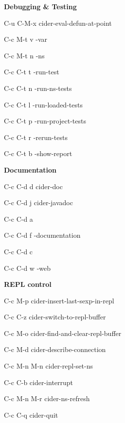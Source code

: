 \documentclass[a4paper,10pt]{article}
\renewcommand\section[1]{\bigskip\par\textbf{\large#1}\medskip}
\newcommand\keyify[1]{\keys{\ttfamily#1}}
\begin{document}
\begin{multicols}{2}
\columnbreak

\section{Debugging \& Testing}
\begin{keylist}[labelwidth=\widthof{\keyify{C-c C-d C-a}}]
\item[C-u C-M-x] cider-eval-defun-at-point
\item[C-c M-t v] -var
\item[C-c M-t n] \ns                    -ns
\item[C-c C-t t] -run-test
\item[C-c C-t n] \ns            -run-ns-tests
\item[C-c C-t l] \ns            -run-loaded-tests
\item[C-c C-t p] \ns            -run-project-tests
\item[C-c C-t r] \ns            -rerun-tests
\item[C-c C-t b] \ns            -show-report
\end{keylist}

\section{Documentation}
\begin{keylist}[labelwidth=\widthof{\keyify{C-c C-d C-a}}]
  \item[C-c C-d d] cider-doc
  \item[C-c C-d j] cider-javadoc
  \item[C-c C-d a] 
  \item[C-c C-d f] \ns               -documentation
  \item[C-c C-d c] 
  \item[C-c C-d w] \ns                   -web
\end{keylist}

\section{REPL control}
\begin{keylist}[labelwidth=\widthof{\keyify{C-c M-c}}]
  \item[C-c M-p] cider-insert-last-sexp-in-repl
  \item[C-c C-z] cider-switch-to-repl-buffer
  \item[C-c M-o] cider-find-and-clear-repl-buffer
  \item[C-c M-d] cider-describe-connection
  \item[C-c M-n M-n] cider-repl-set-ns
  \item[C-c C-b] cider-interrupt
  \item[C-c M-n M-r] cider-ns-refresh
  \item[C-c C-q] cider-quit
\end{keylist}
\end{multicols}
\end{document}
